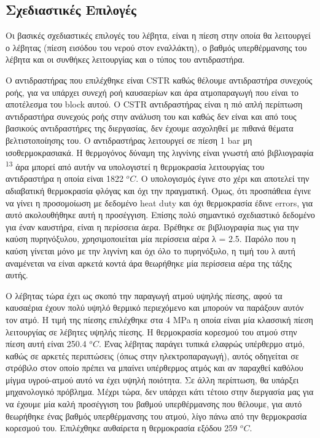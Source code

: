 \documentclass[11pt]{article}
\makeatletter
\newcommand{\citeprocitem}[2]{\hyper@linkstart{cite}{citeproc_bib_item_#1}#2\hyper@linkend}
\makeatother
\begin{document}
\subsection{Σχεδιαστικές Επιλογές}
\label{sec:org5471561}
Οι βασικές σχεδιαστικές επιλογές του λέβητα, είναι η πίεση στην οποία θα λειτουργεί ο λέβητας (πίεση εισόδου του νερού στον εναλλάκτη), ο βαθμός υπερθέρμανσης του λέβητα και οι συνθήκες λειτουργίας και ο τύπος του αντιδραστήρα.

Ο αντιδραστήρας που επιλέχθηκε είναι CSTR καθώς θέλουμε αντιδραστήρα συνεχούς ροής, για να υπάρχει συνεχή ροή καυσαερίων και άρα ατμοπαραγωγή που είναι το αποτέλεσμα του block αυτού. Ο CSTR αντιδραστήρας είναι η πιό απλή περίπτωση αντιδραστήρα συνεχούς ροής στην ανάλυση του και καθώς δεν είναι και από τους βασικούς αντιδραστήρες της διεργασίας, δεν έχουμε ασχοληθεί με πιθανά θέματα βελτιστοποίησης του. Ο αντιδραστήρας λειτουργεί σε πίεση 1 bar μη ισοθερμοκρασιακά. Η θερμογόνος δύναμη της λιγνίνης είναι γνωστή από βιβλιογραφία \textsuperscript{\citeprocitem{13}{13}} άρα μπορεί από αυτήν να υπολογιστεί η θερμοκρασία λειτουργίας του αντιδραστήρα η οποία είναι 1822 \(^oC\). Ο υπολογισμός έγινε στο χέρι και αποτελεί την αδιαβατική θερμοκρασία φλόγας και όχι την πραγματική. Όμως, ότι προσπάθεια έγινε να γίνει η προσομοίωση με δεδομένο heat duty και όχι θερμοκρασία έδινε errors, για αυτό ακολουθήθηκε αυτή η προσέγγιση. Επίσης πολύ σημαντικό σχεδιαστικό δεδομένο για έναν καυστήρα, είναι η περίσσεια άερα. Βρέθηκε σε βιβλιογραφία πως για την καύση πυρηνόξυλου, χρησιμοποιείται μία περίσσεια αέρα λ = 2.5. Παρόλο που η καύση γίνεται μόνο με την λιγνίνη και όχι όλο το πυρηνόξυλο, η τιμή του λ αυτή αναμένεται να είναι αρκετά κοντά άρα θεωρήθηκε μία περίσσεια αέρα της τάξης αυτής.

Ο λέβητας τώρα έχει ως σκοπό την παραγωγή ατμού υψηλής πίεσης, αφού τα καυσαέρια έχουν πολύ υψηλό θερμικό περιεχόμενο και μπορούν να παράξουν αυτόν τον ατμό. Η τιμή της πίεσης επιλέχθηκε στα 4 MPa η οποία είναι μία κλασσική πίεση λειτουργίας σε λέβητες υψηλής πίεσης. Η θερμοκρασία κορεσμού του ατμού στην πίεση αυτή είναι 250.4 \(^oC\). Ένας λέβητας παράγει τυπικά ελαφρώς υπέρθερμο ατμό, καθώς σε αρκετές περιπτώσεις (όπως στην ηλεκτροπαραγωγή), αυτός οδηγείται σε στρόβιλο στον οποίο πρέπει να μπαίνει υπέρθερμος ατμός και αν παραχθεί καθόλου μίγμα υγρού-ατμού αυτό να έχει υψηλή ποιότητα. Σε άλλη περίπτωση, θα υπάρξει μηχανολογικό πρόβλημα. Μέχρι τώρα, δεν υπάρχει κάτι τέτοιο στην διεργασία μας για να έχουμε μία καλή προσέγγιση του βαθμού υπερθέρμανσης που θέλουμε, για αυτό θεωρήθηκε ένας βαθμός υπερθέρμανσης του ατμού, λίγο πάνω από την θερμοκρασία κορεσμού του. Επιλέχθηκε αυθαίρετα η θερμοκρασία εξόδου 259 \(^oC\). 
\end{document}
